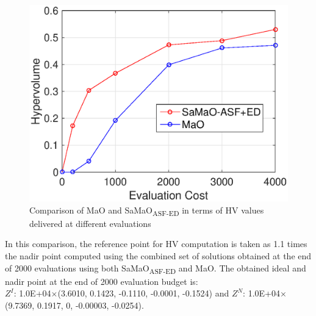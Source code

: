 \documentclass[onecolumn,10pt]{asme2ej}
\begin{document}
\begin{figure}[!htb]
	\centering    
	\includegraphics[scale = 0.8]{figures/fig13.eps}   
	\caption{Comparison of MaO and SaMaO\textsubscript{ASF-ED} in terms of HV values delivered at different evaluations}
	\label{fig:HV}
\end{figure}

In this comparison, the reference point for HV computation is taken as 1.1 times the nadir point computed using the combined set of solutions obtained at the end of 2000 evaluations using both SaMaO\textsubscript{ASF-ED} and MaO. The obtained ideal and nadir point at the end of 2000 evaluation budget is:\\ 
$Z^I$: 1.0E+04$\times$(3.6010, 0.1423, -0.1110, -0.0001, -0.1524) and $Z^N$: 1.0E+04$\times$(9.7369, 0.1917, 0, -0.00003, -0.0254).
 




\scriptsize
 
\balance

\end{document}
